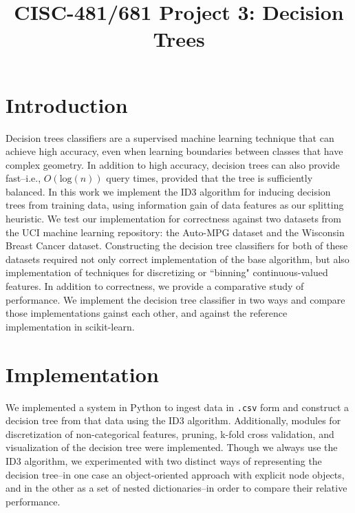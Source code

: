 \documentclass[12pt, conference, compsocconf]{IEEEtran}
\begin{document}
\title{CISC-481/681 Project 3: Decision Trees}

\author{
}

\maketitle

\section{Introduction}
Decision trees classifiers are a supervised machine learning technique that can achieve high accuracy, even when learning boundaries between classes that have complex geometry. 
In addition to high accuracy, decision trees can also provide fast--i.e., $O(\text{log}(n))$ query times, provided that the tree is sufficiently balanced. 
In this work we implement the ID3 algorithm for inducing decision trees from training data, using information gain of data features as our splitting heuristic. 
We test our implementation for correctness against two datasets from the UCI machine learning repository: the Auto-MPG dataset and the Wisconsin Breast Cancer dataset.
Constructing the decision tree classifiers for both of these datasets required not only correct implementation of the base algorithm, but also implementation of techniques for discretizing or ``binning" continuous-valued features.
In addition to correctness, we provide a comparative study of performance. 
We implement the decision tree classifier in two ways and compare those implementations gainst each other, and against the reference implementation in scikit-learn. 

\section{Implementation}
We implemented a system in Python to ingest data in \texttt{.csv} form and construct a decision tree from that data using the ID3 algorithm.
Additionally, modules for discretization of non-categorical features, pruning, k-fold cross validation, and visualization of the decision tree were implemented.
Though we always use the ID3 algorithm, we experimented with two distinct ways of representing the decision tree--in one case an object-oriented approach with explicit node objects, and in the other as a set of nested dictionaries--in order to compare their relative performance.  
\end{document}
